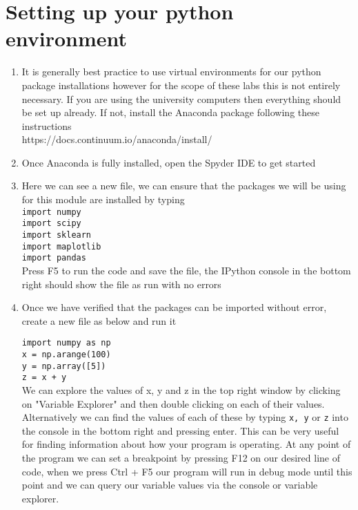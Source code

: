 \documentclass[12pt]{article}
\def\code#1{\texttt{#1}} %
\begin{document}
\section{Setting up your python environment}
\begin{enumerate}
\item It is generally best practice to use virtual environments for our python package installations however for the scope of these labs this is not entirely necessary. If you are using the university computers then everything should be set up already. If not, install the Anaconda package following these instructions \\https://docs.continuum.io/anaconda/install/ 
\item Once Anaconda is fully installed, open the Spyder IDE to get started
\item Here we can see a new file, we can ensure that the packages we will be using for this module are installed by typing \\
\code{import numpy \\ import scipy \\ import sklearn \\ import maplotlib \\ import pandas} \\
Press F5 to run the code and save the file, the IPython console in the bottom right should show the file as run with no errors 
\item Once we have verified that the packages can be imported without error, create a new file as below and run it

\code{import numpy as np \\ x = np.arange(100) \\ y = np.array([5]) \\ z = x + y } \\

We can explore the values of x, y and z in the top right window by clicking on "Variable Explorer" and then double clicking on each of their values. Alternatively we can find the values of each of these by typing \code{x, y} or \code{z} into the console in the bottom right and pressing enter. This can be very useful for finding information about how your program is operating. At any point of the program we can set a breakpoint by pressing F12 on our desired line of code, when we press Ctrl + F5 our program will run in debug mode until this point and we can query our variable values via the console or variable explorer.
\end{enumerate}
\end{document}
